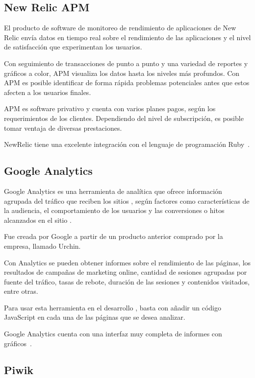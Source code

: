 \subsection{New Relic APM}

El producto de software de monitoreo de rendimiento de aplicaciones de New
Relic envía datos en tiempo real sobre el rendimiento de las aplicaciones  y
el nivel de satisfacción que experimentan los usuarios.

Con seguimiento de transacciones de punto a punto y una variedad de reportes y
gráficos a color, APM visualiza los datos hasta los niveles más profundos. Con
APM es posible identificar de forma rápida problemas potenciales antes que
estos afecten a los usuarios finales.

APM es software privativo y cuenta con varios planes pagos, según los
requerimientos de los clientes. Dependiendo del nivel de subscripción, es
posible tomar ventaja de diversas prestaciones.

NewRelic tiene una excelente integración con el lenguaje de programación
Ruby~\cite{newrelic}.

\subsection{Google Analytics}

Google Analytics es una herramienta de analítica  que ofrece información
agrupada del tráfico que reciben los sitios , según factores como
características de la audiencia, el comportamiento de los usuarios y las
conversiones o hitos alcanzados en el sitio .

Fue creada por Google a partir de un producto anterior comprado por la empresa,
llamado Urchin.

Con Analytics se pueden obtener informes sobre el rendimiento de las páginas,
los resultados de campañas de marketing online, cantidad de sesiones agrupadas
por fuente del tráfico, tasas de rebote, duración de las sesiones y contenidos
visitados, entre otras.

Para usar esta herramienta en el desarrollo , basta con añadir un código
JavaScript en cada una de las páginas  que se desea analizar.

Google Analytics cuenta con una interfaz muy completa de informes con
gráficos~\cite{analytics}.

\subsection{Piwik}

